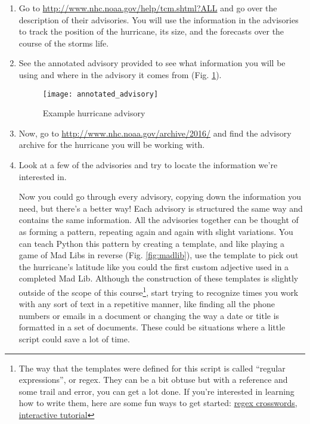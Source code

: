 \documentclass{article}
\begin{document}
\begin{enumerate}
    \item Go to \url{http://www.nhc.noaa.gov/help/tcm.shtml?ALL} and go over the description of their advisories.  You will use the information in the advisories to track the position of the hurricane, its size, and the forecasts over the course of the storms life.  
    \item See the annotated advisory provided to see what information you will be using and where in the advisory it comes from (Fig. \ref{fig:sampleadvisory}).

\begin{figure}
    \texttt{[image: annotated\_advisory]}
    \caption{Example hurricane advisory}
    \label{fig:sampleadvisory}
\end{figure}

    \item Now, go to \url{http://www.nhc.noaa.gov/archive/2016/} and find the advisory archive for the hurricane you will be working with.  
    \item Look at a few of the advisories and try to locate the information we're interested in.  
        
        Now you could go through every advisory, copying down the information you need, but there's a better way!  Each advisory is structured the same way and contains the same information.  All the advisories together can be thought of as forming a pattern, repeating again and again with slight variations. You can teach Python this pattern by creating a template, and like playing a game of Mad Libs in reverse (Fig. \ref{fig:madlib}), use the template to pick out the hurricane's latitude like you could the first custom adjective used in a completed Mad Lib.  Although the construction of these templates is slightly outside of the scope of this course\footnote{The way that the templates were defined for this script is called ``regular expressions'', or regex.  They can be a bit obtuse but with a reference and some trail and error, you can get a lot done.  If you're interested in learning how to write them, here are some fun ways to get started: \href{https://regexcrossword.com/howtoplay}{regex crosswords}, \href{http://regexone.com/}{interactive tutorial}}, start trying to recognize times you work with any sort of text in a repetitive manner, like finding all the phone numbers or emails in a document or changing the way a date or title is formatted in a set of documents.  These could be situations where a little script could save a lot of time.
\end{enumerate}
\end{document}
